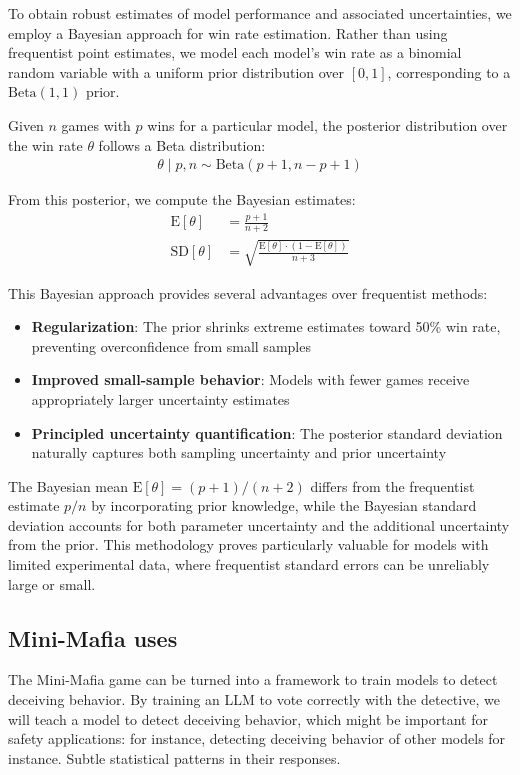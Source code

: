 \documentclass{article}
\begin{document}
To obtain robust estimates of model performance and associated uncertainties, we employ a Bayesian approach for win rate estimation. Rather than using frequentist point estimates, we model each model's win rate as a binomial random variable with a uniform prior distribution over $[0,1]$, corresponding to a $\text{Beta}(1,1)$ prior.

Given $n$ games with $p$ wins for a particular model, the posterior distribution over the win rate $\theta$ follows a Beta distribution:
\begin{align}
\theta \mid p, n \sim \text{Beta}(p + 1, n - p + 1)
\end{align}

From this posterior, we compute the Bayesian estimates:
\begin{align}
\text{E}[\theta] &= \frac{p + 1}{n + 2}\\[0.5em]
\text{SD}[\theta] &= \sqrt{\frac{\text{E}[\theta] \cdot (1 - \text{E}[\theta])}{n + 3}}
\end{align}

This Bayesian approach provides several advantages over frequentist methods:
\begin{itemize}
\item \textbf{Regularization}: The prior shrinks extreme estimates toward 50\% win rate, preventing overconfidence from small samples
\item \textbf{Improved small-sample behavior}: Models with fewer games receive appropriately larger uncertainty estimates
\item \textbf{Principled uncertainty quantification}: The posterior standard deviation naturally captures both sampling uncertainty and prior uncertainty
\end{itemize}

The Bayesian mean $\text{E}[\theta] = (p+1)/(n+2)$ differs from the frequentist estimate $p/n$ by incorporating prior knowledge, while the Bayesian standard deviation accounts for both parameter uncertainty and the additional uncertainty from the prior. This methodology proves particularly valuable for models with limited experimental data, where frequentist standard errors can be unreliably large or small. 


\subsection{Mini-Mafia uses}

The Mini-Mafia game can be turned into a framework to train models to detect deceiving behavior. By training an LLM to vote correctly with the detective, we will teach a model to detect deceiving behavior, which might be important for safety applications: for instance, detecting deceiving behavior of other models for instance. Subtle statistical patterns in their responses.
\end{document}

